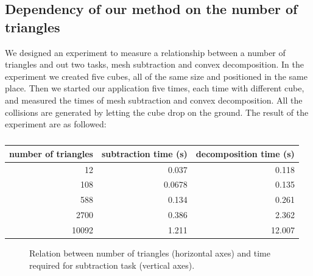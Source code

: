 \subsection{Dependency of our method on the number of triangles}
We designed an experiment to measure a relationship between a number of triangles and out two tasks, mesh subtraction and convex decomposition. In the experiment we created five cubes, all of the same size and positioned in the same place. Then we started our application five times, each time with different cube, and measured the times of mesh subtraction and convex decomposition. All the collisions are generated by letting the cube drop on the ground. The result of the experiment are as followed:
\begin{table}
\centering
\begin{tabular}{r|r|r}
number of triangles & subtraction time (s) & decomposition time (s) \\
\hline
12 & 0.037 & 0.118 \\
108 & 0.0678 & 0.135 \\
588 & 0.134 & 0.261 \\ 
2700 & 0.386 & 2.362 \\ 
10092 & 1.211 & 12.007 \\
\end{tabular}
\caption{}
\label{tab:subtraction-decomposition}
\end{table}

\begin{figure}
\centering
{}
\caption{Relation between number of triangles (horizontal axes) and time required for subtraction task (vertical axes).}
\label{fig:triangletimes}
\end{figure}


